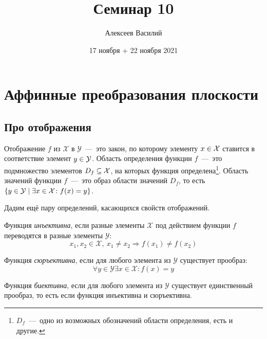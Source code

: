 \documentclass[a4paper,12pt]{article}
\author{Алексеев Василий}
\title{Семинар 10}
\date{17 ноября + 22 ноября 2021}
\begin{document}
  \maketitle
  
  \tableofcontents

  \thispagestyle{empty}
  
  \newpage
  


  \section{Аффинные преобразования плоскости}
  
  \subsection{Про отображения}
  
  Отображение $f$ из $\mathcal X$ в $\mathcal Y$~---~это закон, по которому элементу $x \hm\in \mathcal X$ ставится в соответствие элемент $y \hm\in \mathcal Y$.
  Область определения функции $f$~---~это подмножество элементов $D_f \hm\subseteq \mathcal X$, на которых функция определена\footnote{$D_f$~---~одно из возможных обозначений области определения, есть и другие.}.
  Область значений функции $f$~---~это образ области значений $D_f$, то есть $\{y \hm\in \mathcal Y \hm\mid \exists x \hm\in \mathcal X\colon f(x) \hm= y\}$.
  
  Дадим ещё пару определений, касающихся свойств отображений.
  
  \begin{definition}[Инъекция]
    Функция \emph{инъективна}, если разные элементы $\mathcal X$ под действием функции $f$ переводятся в разные элементы $\mathcal Y$:
    \[
      x_1, x_2 \in \mathcal X,\ x_1 \not= x_2 \Rightarrow f(x_1) \not= f(x_2)
    \]
  \end{definition}
  
  \begin{definition}[Сюръекция]
    Функция \emph{сюръективна}, если для любого элемента из $\mathcal Y$ существует прообраз:
    \[
      \forall y \in \mathcal Y \exists x \in \mathcal X\colon f(x) = y
    \]
  \end{definition}
  
  \begin{definition}[Биекция]
    Функция \emph{биективна}, если для любого элемента из $\mathcal Y$ существует единственный прообраз, то есть если функция инъективна и сюръективна.
  \end{definition}
  
\end{document}
